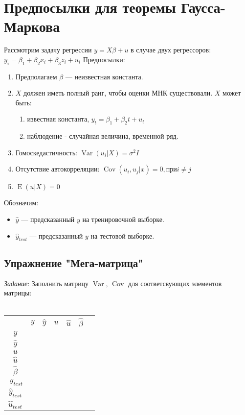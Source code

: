 \documentclass[12pt]{article} %
\theoremstyle{definition} %
\DeclareMathOperator{\Cov}{Cov}
\DeclareMathOperator{\Var}{Var}
\DeclareMathOperator{\E}{E}
\begin{document}
         
\section{Предпосылки для теоремы Гаусса-Маркова}
Рассмотрим задачу регрессии $y=X\beta+u$ в случае двух регрессоров: $y_i=\beta_1+\beta_2x_i+\beta_3z_i+u_i$
Предпосылки:
\begin{enumerate}
    \item Предполагаем $\beta$ — неизвестная константа.
    \item $X$ должен иметь полный ранг, чтобы оценки МНК существовали. $X$ может быть:
    \begin{enumerate}
        \item известная константа, $y_t=\beta_1+\beta_2t+u_t$
        \item наблюдение - случайная величина, временной ряд.
    \end{enumerate}
    \item Гомоскедастичность: $\Var(u_i|X)=\sigma^2I$
    \item Отсутствие автокорреляции: $\Cov(u_i,u_j|x)=0, при i\neq j$
    \item$ \E(u|X)=0$
\end{enumerate}
\quad Обозначим:
\begin{itemize}
    \item $\hat{y}$  —  предсказанный $y$ на тренировочной выборке.
    \item $\hat{y}_{test}$  —  предсказанный $y$ на тестовой выборке.
\end{itemize}





\subsection{Упражнение "Мега-матрица"}
\textit{Задание}: Заполнить матрицу $\Var$, $\Cov$ для соответсвующих элементов матрицы:
\\\\
\begin{tabular}{c||rrrrrr|}
 &$ y $& $\hat{y}$ &$ u $& $\hat{u}$ &  $\hat{\beta}$ \\
\hline
\hline
$ y $\\
$ \hat{y} $\\
$ u $\\
$ \hat{u} $\\
$ \hat{\beta} $\\
$\ y_{test}$ \\
$\hat{y}_{test}$ \\
$\hat{u}_{test}$ \\
\hline
\end{tabular}
\\\\
\end{document}
